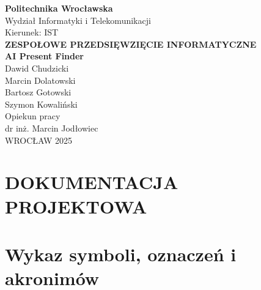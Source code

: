 \documentclass[12pt,a4paper]{article}
\begin{document}
\begin{center}
\textbf{\Large Politechnika Wrocławska}\\[0.3cm]
Wydział Informatyki i Telekomunikacji\\[0.3cm]
Kierunek: IST\\[2cm]

\textbf{\Large ZESPOŁOWE PRZEDSIĘWZIĘCIE INFORMATYCZNE}\\[2cm]

\textbf{\Large AI Present Finder}\\[2cm]

Dawid Chudzicki\\[0.2cm]
Marcin Dolatowski\\[0.2cm]
Bartosz Gotowski\\[0.2cm]
Szymon Kowaliński\\[2cm]

Opiekun pracy\\
dr inż. Marcin Jodłowiec\\[2cm]


WROCŁAW 2025
\end{center}

\newpage

\tableofcontents
\newpage

\section*{DOKUMENTACJA PROJEKTOWA}

\section{Wykaz symboli, oznaczeń i akronimów}
\end{document}
